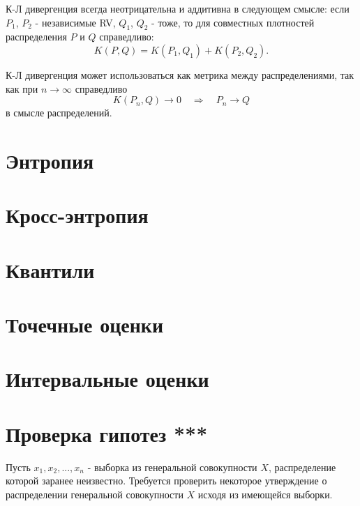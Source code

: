 К-Л дивергенция всегда неотрицательна и аддитивна в следующем смысле: если $P_1$, $P_2$ - независимые RV, $Q_1$, $Q_2$ - тоже, то для совместных плотностей распределения $P$ и $Q$ справедливо:
$$
K(P, Q) =  K(P_1, Q_1) + K(P_2, Q_2).
$$

К-Л дивергенция может использоваться как метрика между распределениями, так как при $n \rightarrow \infty$ справедливо
$$
K(P_n, Q) \rightarrow 0 \quad \Rightarrow \quad P_n \rightarrow Q
$$
в смысле распределений.

\section{Энтропия}


\section{Кросс-энтропия}


\section{Квантили}


\section{Точечные оценки}


\section{Интервальные оценки}


\section{Проверка гипотез ***}

Пусть $x_1, x_2, ..., x_n$ - выборка из генеральной совокупности $X$, распределение которой заранее неизвестно.
Требуется проверить некоторое утверждение о распределении генеральной совокупности $X$ исходя из имеющейся выборки.

